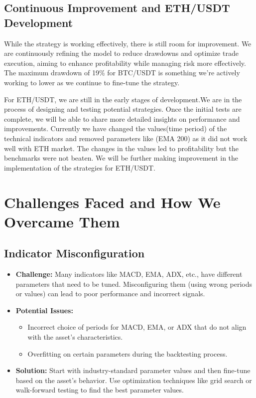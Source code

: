 \documentclass[12pt]{article}
\begin{document}
\subsection{Continuous Improvement and ETH/USDT Development}
While the strategy is working effectively, there is still room for improvement. We are continuously refining the model to reduce drawdowns and optimize trade execution, aiming to enhance profitability while managing risk more effectively. The maximum drawdown of 19\% for BTC/USDT is something we're actively working to lower as we continue to fine-tune the strategy.

For ETH/USDT, we are still in the early stages of development.We are in the process of designing and testing potential strategies. Once the initial tests are complete, we will be able to share more detailed insights on performance and improvements. Currently we have changed the values(time period) of the technical indicators  and removed parameters like (EMA 200) as it did not work well with ETH market. The changes in the values led to profitability but the benchmarks were not beaten. We will be further making improvement in the implementation of the strategies for ETH/USDT.

\section{Challenges Faced and How We Overcame Them}
\subsection{Indicator Misconfiguration}
\begin{itemize}
    \item \textbf{Challenge:} Many indicators like MACD, EMA, ADX, etc., have different parameters that need to be tuned. Misconfiguring them (using wrong periods or values) can lead to poor performance and incorrect signals.
    \item \textbf{Potential Issues:}
    \begin{itemize}
        \item Incorrect choice of periods for MACD, EMA, or ADX that do not align with the asset's characteristics.
        \item Overfitting on certain parameters during the backtesting process.
    \end{itemize}
    \item \textbf{Solution:}
    Start with industry-standard parameter values and then fine-tune based on the asset's behavior. Use optimization techniques like grid search or walk-forward testing to find the best parameter values.
\end{itemize}
\end{document}
